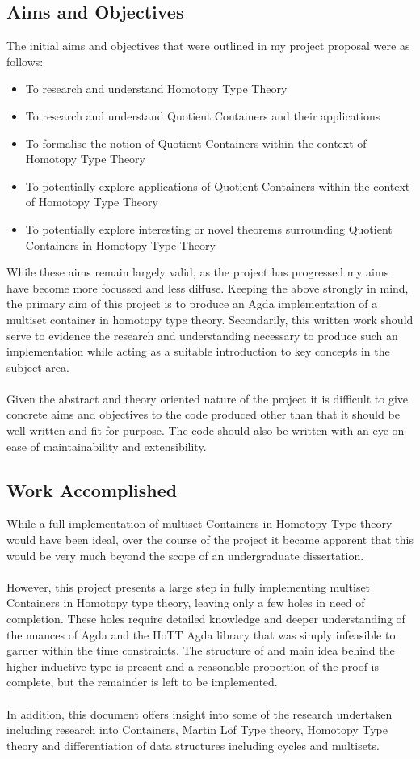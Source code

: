 \documentclass[12pt]{report}
\begin{document}
\subsection*{Aims and Objectives}
The initial aims and objectives that were outlined in my project proposal were as follows:
\begin{itemize}
\item To research and understand Homotopy Type Theory
\item To research and understand Quotient Containers and their applications
\item To formalise the notion of Quotient Containers within the context of Homotopy Type Theory
\item To potentially explore applications of Quotient Containers within the context of Homotopy Type Theory
\item To potentially explore interesting or novel theorems surrounding Quotient Containers in Homotopy Type Theory
\end{itemize}

While these aims remain largely valid, as the project has progressed my aims have become more focussed and less diffuse. Keeping the above strongly in mind, the primary aim of this project is to produce an Agda implementation of a multiset container in homotopy type theory. Secondarily, this written work should serve to evidence the research and understanding necessary to produce such an implementation while acting as a suitable introduction to key concepts in the subject area.\\
\\
Given the abstract and theory oriented nature of the project it is difficult to give concrete aims and objectives to the code produced other than that it should be well written and fit for purpose. The code should also be written with an eye on ease of maintainability and extensibility. 

\newpage
\subsection*{Work Accomplished}
While a full implementation of multiset Containers in Homotopy Type theory would have been ideal, over the course of the project it became apparent that this would be very much beyond the scope of an undergraduate dissertation.\\
\\
However, this project presents a large step in fully implementing multiset Containers in Homotopy type theory, leaving only a few holes in need of completion. These holes require detailed knowledge and deeper understanding of the nuances of Agda and the HoTT Agda library that was simply infeasible to garner within the time constraints. The structure of and main idea behind the higher inductive type is present and a reasonable proportion of the proof is complete, but the remainder is left to be implemented.\\
\\
In addition, this document offers insight into some of the research undertaken including research into Containers, Martin L\"of Type theory, Homotopy Type theory and differentiation of data structures including cycles and multisets.
\end{document}

